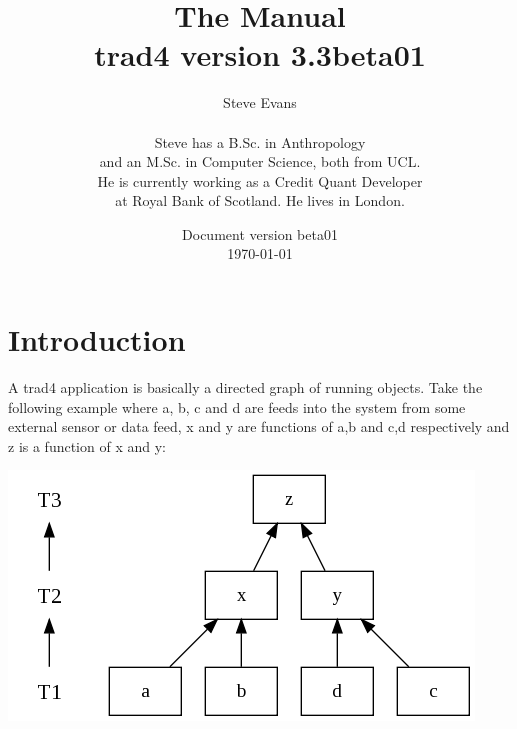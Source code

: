 \documentclass{report}
\begin{document}
\title{The Manual \\
{\large \textbf{trad4 version 3.3beta01}}}

\author{Steve Evans \\\\ Steve has a B.Sc. in Anthropology \\ and an M.Sc. in Computer Science, both from UCL. \\ He is currently working as a Credit Quant Developer \\ at Royal Bank of Scotland. He lives in London.}

\date{Document version beta01 \\
\today}

\maketitle



\setcounter{tocdepth}{1}
\tableofcontents

\chapter{Introduction}

A trad4 application is basically a directed graph of running objects. Take the following example where a, b, c and d are feeds into the system from some external sensor or data feed, x and y are functions of a,b and c,d respectively and z is a function of x and y:

\includegraphics[scale=0.5]{simplemathsabstract.png}
\end{document}
